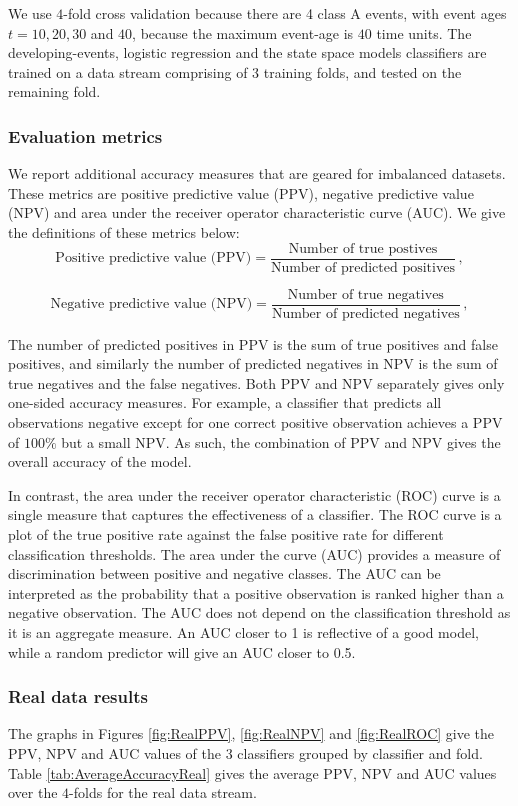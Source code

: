 \documentclass[11pt]{article}
\begin{document}
 	
 	We use $4$-fold cross validation because there are 4 class A events, with event ages  $t = 10, 20, 30$ and  $40$, because the maximum event-age is $40$ time units. The developing-events, logistic regression and the state space models classifiers  are trained on a data stream comprising of 3 training folds, and tested on the remaining fold. 
 	
	
 	\subsubsection{Evaluation metrics}
 	We report additional accuracy measures that are geared for imbalanced datasets. These metrics are positive predictive value (PPV), negative predictive value (NPV) and area under the receiver operator characteristic curve (AUC). We give the definitions of these metrics below:
 	$$ \text{Positive predictive value (PPV)} = \frac{ \text{Number of true postives} }{ \text{Number of predicted positives}  }  \, ,   $$ 
 	
 	$$ \text{Negative predictive value (NPV)} = \frac{ \text{Number of true negatives} }{ \text{Number of predicted negatives}  }  \, ,   $$ 
 	
 	\noindent
	The number of predicted positives in PPV is the sum of true positives and false positives, and similarly the number of predicted negatives in NPV is the sum of true negatives and the false negatives. Both PPV and NPV separately gives only  one-sided accuracy measures. For example, a classifier that predicts all observations negative except for one correct positive observation achieves a PPV of $100\%$ but a small NPV. As such, the combination of PPV and NPV gives the overall accuracy of the model. 
	
	In contrast, the area under the receiver operator characteristic (ROC) curve  is a single measure that captures the effectiveness of a classifier. The ROC curve is a plot of the true positive rate against the false positive rate for different classification thresholds. The area under the curve (AUC) provides a measure of discrimination between positive and negative classes. The AUC can be interpreted as the probability that a positive observation is ranked higher than a negative observation. The AUC does not depend on the classification threshold as it is an aggregate measure.  An AUC closer to 1 is reflective of a good model, while a random predictor will give an AUC closer to 0.5. 
	

	\subsubsection{Real data results}
	The graphs in Figures \ref{fig:RealPPV}, \ref{fig:RealNPV} and \ref{fig:RealROC} give the PPV, NPV and AUC values of the 3 classifiers grouped by classifier and fold. Table \ref{tab:AverageAccuracyReal} gives the average PPV, NPV and AUC values over the $4$-folds for the real data stream.
	
\end{document}
